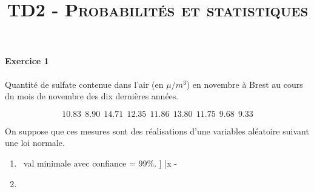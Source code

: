 \documentclass[12pt]{article}
\date{\vspace{-5ex}}
\author{\vspace{-5ex}}
\title{\textsc{TD2 - Probabilités et statistiques}\\}
\begin{document}
\maketitle

\paragraph*{Exercice 1} Quantité de sulfate contenue dans l'air (en $\mu/m^3$) en novembre à Brest au cours du mois de novembre des dix dernières années.

$$10.83\ \ 8.90\ \ 14.71\ \ 12.35\ \ 11.86\ \ 13.80\ \ 11.75\ \ 9.68\ \ 9.33$$ 

On suppose que ces mesures sont des réalisations d'une variables aléatoire suivant une loi normale.


\begin{enumerate}
\item \mu \ val minimale avec confiance \alpha = 99\%. \mu \in ] \bar{x} - \frac{^\sigma}{}



\item 

\end{enumerate}
\end{document}
